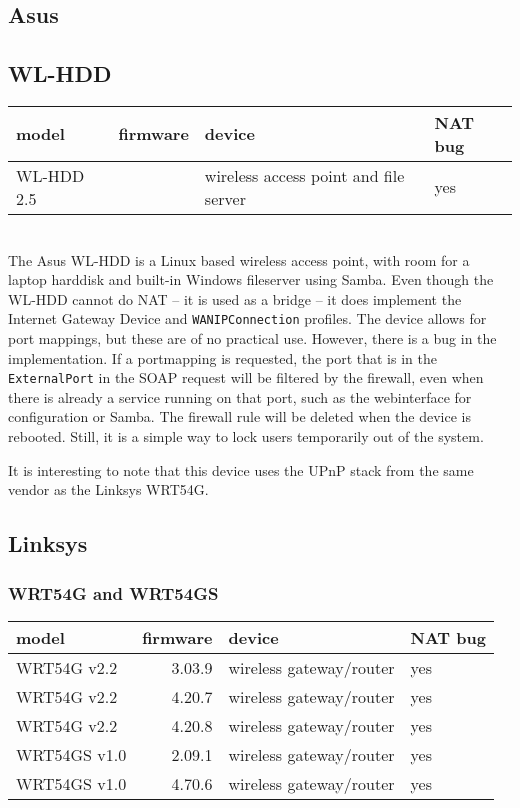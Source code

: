 \documentclass[10pt]{article}
\begin{document}
\subsection{Asus}

\subsection{WL-HDD}
\begin{tabular}{|l|r|l|l|}
\hline
model & firmware & device & NAT bug \\
\hline
WL-HDD 2.5 & & wireless access point and file server & yes \\
\hline
\end{tabular} \\

The Asus WL-HDD is a Linux based wireless access point, with room for a
laptop harddisk and built-in Windows fileserver using Samba. Even though the
WL-HDD cannot do NAT -- it is used as a bridge -- it does implement the
Internet Gateway Device and \texttt{WANIPConnection} profiles. The device
allows for port mappings, but these are of no practical use. However, there
is a bug in the implementation. If a portmapping is requested, the port that
is in the \texttt{ExternalPort} in the SOAP request will be filtered by the
firewall, even when there is already a service running on that port, such as
the webinterface for configuration or Samba. The firewall rule will be deleted
when the device is rebooted. Still, it is a simple way to lock users
temporarily out of the system.

It is interesting to note that this device uses the UPnP stack from the
same vendor as the Linksys WRT54G.

\subsection{Linksys}

\subsubsection{WRT54G and WRT54GS}

\begin{tabular}{|l|r|l|l|}
\hline
model & firmware & device & NAT bug \\
\hline
WRT54G v2.2 & 3.03.9 & wireless gateway/router & yes \\
\hline
WRT54G v2.2 & 4.20.7 & wireless gateway/router & yes \\
\hline
WRT54G v2.2 & 4.20.8 & wireless gateway/router & yes \\
\hline
WRT54GS v1.0 & 2.09.1 & wireless gateway/router & yes \\
\hline
WRT54GS v1.0 & 4.70.6 & wireless gateway/router & yes \\
\hline
\end{tabular} \\
\end{document}
